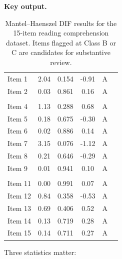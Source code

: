 \documentclass[
  11pt,
  letterpaper,
]{scrbook}
\begin{document}
\textbf{Key output.}

\begin{longtable}[t]{lccccc}

\caption{\label{tbl-mh-results}Mantel--Haenszel DIF results for the
15-item reading comprehension dataset. Items flagged at Class B or C are
candidates for substantive review.}

\tabularnewline

\toprule
\cellcolor[HTML]{2E4057}{\textcolor{white}{Item}} & \cellcolor[HTML]{2E4057}{\textcolor{white}{MH χ²}} & \cellcolor[HTML]{2E4057}{\textcolor{white}{p}} & \cellcolor[HTML]{2E4057}{\textcolor{white}{MH Δ}} & \cellcolor[HTML]{2E4057}{\textcolor{white}{ETS Class}} & \cellcolor[HTML]{2E4057}{\textcolor{white}{Flag}}\\
\midrule
Item 1 & 2.04 & 0.154 & -0.91 & A & \\
Item 2 & 0.03 & 0.861 & 0.16 & A & \\
\cellcolor[HTML]{FFF2CC}{Item 3} & \cellcolor[HTML]{FFF2CC}{5.51} & \cellcolor[HTML]{FFF2CC}{0.019} & \cellcolor[HTML]{FFF2CC}{-1.34} & \cellcolor[HTML]{FFF2CC}{B} & \cellcolor[HTML]{FFF2CC}{! Moderate}\\
Item 4 & 1.13 & 0.288 & 0.68 & A & \\
Item 5 & 0.18 & 0.675 & -0.30 & A & \\
\addlinespace
Item 6 & 0.02 & 0.886 & 0.14 & A & \\
Item 7 & 3.15 & 0.076 & -1.12 & A & \\
Item 8 & 0.21 & 0.646 & -0.29 & A & \\
Item 9 & 0.01 & 0.941 & 0.10 & A & \\
\cellcolor[HTML]{FCE4D6}{Item 10} & \cellcolor[HTML]{FCE4D6}{15.31} & \cellcolor[HTML]{FCE4D6}{0.000} & \cellcolor[HTML]{FCE4D6}{2.29} & \cellcolor[HTML]{FCE4D6}{C} & \cellcolor[HTML]{FCE4D6}{!! Large}\\
\addlinespace
Item 11 & 0.00 & 0.991 & 0.07 & A & \\
Item 12 & 0.84 & 0.358 & -0.53 & A & \\
Item 13 & 0.69 & 0.406 & 0.52 & A & \\
Item 14 & 0.13 & 0.719 & 0.28 & A & \\
Item 15 & 0.14 & 0.711 & 0.27 & A & \\
\bottomrule

\end{longtable}

Three statistics matter:
\end{document}
